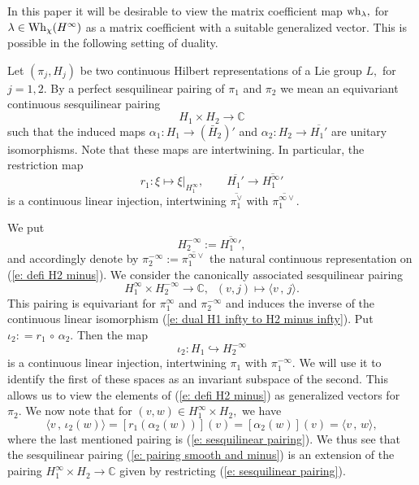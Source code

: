 \documentclass[12pt,a4paper]{article}
\def\qquad{\quad\quad}
\def\msy#1{{\mathbb #1}}
\def\C{{\msy C}}
\def\ga{\alpha}
\def\gl{\lambda}
\def\to{\rightarrow}
\def\inp#1#2{\langle#1\,,\,#2\rangle}
\def\after{\,{\scriptstyle\circ}\,}
\numberwithin{Thm}{section}
\numberwithin{equation}{section}
\def\Wh{{\rm Wh}}
\def\embeds{\hookrightarrow}
\numberwithin{equation}{section}
\def\wh{{\rm wh}}
\def\cchi{\chi}
\def\veec{\vee}%
\begin{document}
In this paper it will be desirable to view the matrix coefficient map 
$\wh_\gl,$ for $\gl \in \Wh_\cchi(H^\infty)$ as a matrix coefficient with 
a suitable generalized vector. This is possible in the following setting of duality.

Let $(\pi_j, H_j)$ be two continuous Hilbert representations of a Lie group $L,$ for $j=1,2.$ 
By a perfect sesquilinear pairing of $\pi_1$ and $\pi_2$ 
we mean an equivariant continuous sesquilinear pairing 
\begin{equation}
\label{e: sesquilinear pairing} 
H_1 \times H_2 \to \C
\end{equation}
such that the induced maps $\ga_1: H_1 \to (\bar H_2)'$ and 
$\ga_2: H_2 \to \overline{H_1'}$ are unitary isomorphisms. Note that these maps are intertwining.
In particular, the restriction map
$$
r_1: \xi \mapsto \xi|_{H_1^\infty}, \qquad \overline{H_1'} \to \overline{{H_1^\infty}'}
$$%
is a continuous linear injection, intertwining $\overline{\pi_1^\veec}$ with 
$\overline{\pi_1^{\infty\veec}}.$ 

We put 
\begin{equation}
\label{e: defi H2 minus}
H_2^{-\infty} := \overline{{H_1^\infty}'},
\end{equation}
and accordingly denote by $\pi_2^{-\infty} := \overline{\pi_1^{\infty\veec}}$
the natural continuous representation on (\ref{e: defi H2 minus}).
We consider the canonically associated sesquilinear pairing  
\begin{equation}
 \label{e: pairing smooth and minus}
H_1^\infty  \times H_2^{-\infty} \to \C,\;\; (v,j) \mapsto \inp{v}{j}.
\end{equation}
This pairing is equivariant for $\pi_1^\infty$ and $\pi_2^{-\infty}$ and induces the inverse of the continuous linear isomorphism 
(\ref{e: dual H1 infty to H2 minus infty}).
Put $\iota_2: = r_1 \after\ga_2.$ Then 
the map 
\begin{equation}
\label{e: embedding iota 2}
\iota_2:  H_1 \embeds H_2^{-\infty}
\end{equation} 
is a continuous linear injection, intertwining $\pi_1$ with $\pi_1^{-\infty}.$ 
We will use it to identify the first of these spaces as an invariant subspace of 
the second. 
This allows us to view the elements of (\ref{e: defi H2 minus})
as generalized vectors for $\pi_2.$ 
We now note that for $(v,w)\in H_1^\infty \times H_2,$ we have
$$ 
\inp{v}{\iota_2(w)} = [r_1(\ga_2(w))](v) = [\ga_2(w)](v) = \inp{v}{w},
$$ 
where the last mentioned pairing is  (\ref{e: sesquilinear pairing}). We thus see that 
the sesquilinear pairing (\ref{e: pairing smooth and minus}) is an extension 
of the pairing $H_1^\infty \times H_2 \to \C$ given by restricting (\ref{e: sesquilinear pairing}).
\end{document}
